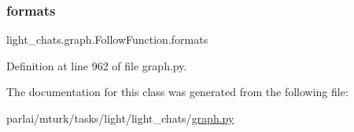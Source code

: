 \subsubsection{\texorpdfstring{formats}{formats}}
{\footnotesize\ttfamily light\+\_\+chats.\+graph.\+Follow\+Function.\+formats}



Definition at line 962 of file graph.\+py.



The documentation for this class was generated from the following file\+:\begin{DoxyCompactItemize}
\item 
parlai/mturk/tasks/light/light\+\_\+chats/\hyperlink{parlai_2mturk_2tasks_2light_2light__chats_2graph_8py}{graph.\+py}\end{DoxyCompactItemize}
